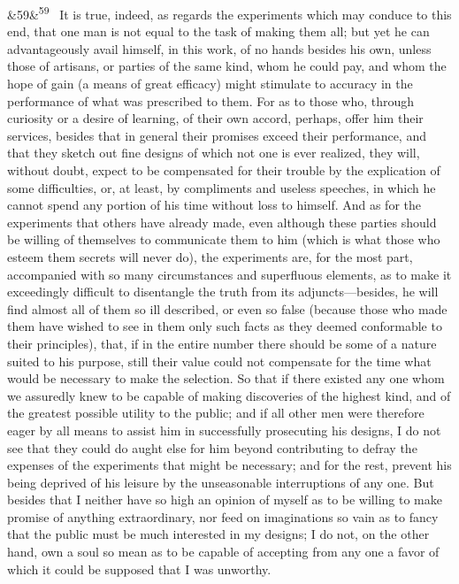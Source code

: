 \documentclass[12pt]{article}
\newcommand{\para}[1][]{\par\noindent\ifx&#1&\else\textsuperscript{\footnotesize #1}~\fi}
\begin{document}
\para[59] It is true, indeed, as regards the experiments which may conduce to this end, that one man is not equal to the task of making them all; but yet he can advantageously avail himself, in this work, of no hands besides his own, unless those of artisans, or parties of the same kind, whom he could pay, and whom the hope of gain (a means of great efficacy) might stimulate to accuracy in the performance of what was prescribed to them. For as to those who, through curiosity or a desire of learning, of their own accord, perhaps, offer him their services, besides that in general their promises exceed their performance, and that they sketch out fine designs of which not one is ever realized, they will, without doubt, expect to be compensated for their trouble by the explication of some difficulties, or, at least, by compliments and useless speeches, in which he cannot spend any portion of his time without loss to himself. And as for the experiments that others have already made, even although these parties should be willing of themselves to communicate them to him (which is what those who esteem them secrets will never do), the experiments are, for the most part, accompanied with so many circumstances and superfluous elements, as to make it exceedingly difficult to disentangle the truth from its adjuncts---besides, he will find almost all of them so ill described, or even so false (because those who made them have wished to see in them only such facts as they deemed conformable to their principles), that, if in the entire number there should be some of a nature suited to his purpose, still their value could not compensate for the time what would be necessary to make the selection. So that if there existed any one whom we assuredly knew to be capable of making discoveries of the highest kind, and of the greatest possible utility to the public; and if all other men were therefore eager by all means to assist him in successfully prosecuting his designs, I do not see that they could do aught else for him beyond contributing to defray the expenses of the experiments that might be necessary; and for the rest, prevent his being deprived of his leisure by the unseasonable interruptions of any one. But besides that I neither have so high an opinion of myself as to be willing to make promise of anything extraordinary, nor feed on imaginations so vain as to fancy that the public must be much interested in my designs; I do not, on the other hand, own a soul so mean as to be capable of accepting from any one a favor of which it could be supposed that I was unworthy.
\end{document}
